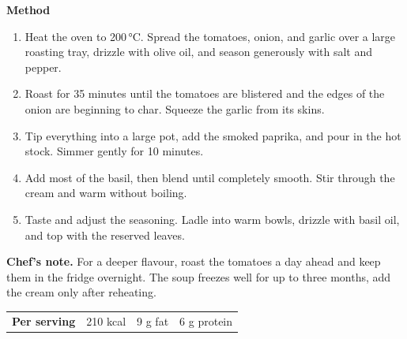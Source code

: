 \documentclass[10pt]{article}
\newcommand{\stepnum}[1]{%
  \tikz[baseline=-0.6ex]{\node[circle, fill=accent, text=white, inner sep=2.5pt,
    font=\small\bfseries, minimum size=1.5em] {#1};}}
\begin{document}
\hfill
\begin{minipage}[t]{0.62\textwidth}
\vspace{0pt}
{\large\bfseries\color{accent} Method}

\vspace{0.6em}
\begin{enumerate}[leftmargin=2.4em, itemsep=0.9em, label=\protect\stepnum{\arabic*}]
  \item Heat the oven to 200\,°C. Spread the tomatoes, onion, and
    garlic over a large roasting tray, drizzle with olive oil, and season
    generously with salt and pepper.
  \item Roast for 35 minutes until the tomatoes are blistered and the edges of
    the onion are beginning to char. Squeeze the garlic from its skins.
  \item Tip everything into a large pot, add the smoked paprika, and pour in
    the hot stock. Simmer gently for 10 minutes.
  \item Add most of the basil, then blend until completely smooth. Stir
    through the cream and warm without boiling.
  \item Taste and adjust the seasoning. Ladle into warm bowls, drizzle with
    basil oil, and top with the reserved leaves.
\end{enumerate}

\vspace{1em}
\begin{tcolorbox}[colback=accent!8, colframe=accent, boxrule=0pt,
  leftrule=3pt, arc=1mm, left=8pt, right=8pt, top=8pt, bottom=8pt]
{\bfseries\color{accent} Chef's note.} For a deeper flavour, roast the
tomatoes a day ahead and keep them in the fridge overnight. The soup freezes
well for up to three months, add the cream only after reheating.
\end{tcolorbox}

\vspace{1em}
\begin{tabular}{@{}llll@{}}
  \textcolor{accent}{\bfseries Per serving} & 210 kcal & 9 g fat & 6 g protein
\end{tabular}
\end{minipage}
\end{document}
